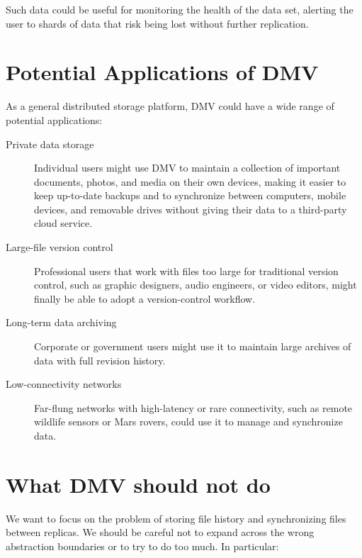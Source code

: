 Such data could be useful for monitoring the health of the data set, alerting
the user to shards of data that risk being lost without further replication.

%


\section{Potential Applications of DMV}

As a general distributed storage platform, \gls{DMV} could have a wide range of
potential applications:

\begin{description}

    \item[Private data storage] Individual users might use \gls{DMV} to maintain
        a collection of important documents, photos, and media on their own
        devices, making it easier to keep up-to-date backups and to synchronize
        between computers, mobile devices, and removable drives without giving
        their data to a third-party cloud service.

    \item[Large-file version control] Professional users that work with files
        too large for traditional version control, such as graphic designers,
        audio engineers, or video editors, might finally be able to adopt a
        version-control workflow.

    \item[Long-term data archiving] Corporate or government users might use it
        to maintain large archives of data with full revision history.

    \item[Low-connectivity networks] Far-flung networks with high-latency or
        rare connectivity, such as remote wildlife sensors or Mars rovers, could
        use it to manage and synchronize data.

\end{description}

%


\section{What DMV should not do}

We want to focus on the problem of storing file history and synchronizing files
between replicas.
We should be careful not to expand across the wrong abstraction boundaries or to
try to do too much.
In particular:

